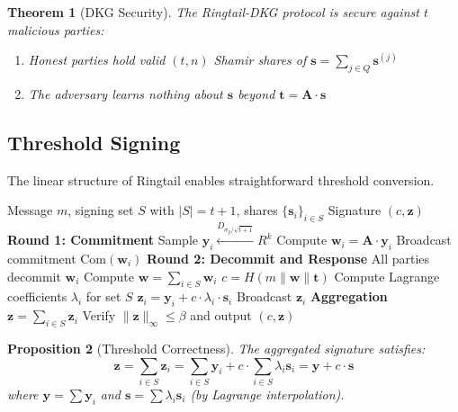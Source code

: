 \documentclass[11pt,a4paper]{article}
\newtheorem{theorem}{Theorem}[section]
\newtheorem{proposition}[theorem]{Proposition}
\begin{document}
\begin{theorem}[DKG Security]
The Ringtail-DKG protocol is secure against $t$ malicious parties:
\begin{enumerate}
    \item Honest parties hold valid $(t,n)$ Shamir shares of $\mathbf{s} = \sum_{j \in Q} \mathbf{s}^{(j)}$
    \item The adversary learns nothing about $\mathbf{s}$ beyond $\mathbf{t} = \mathbf{A} \cdot \mathbf{s}$
\end{enumerate}
\end{theorem}

\subsection{Threshold Signing}

The linear structure of Ringtail enables straightforward threshold conversion.

\begin{algorithm}
\caption{Ringtail-ThresholdSign}
\begin{algorithmic}[1]
\Require Message $m$, signing set $S$ with $|S| = t+1$, shares $\{\mathbf{s}_i\}_{i \in S}$
\Ensure Signature $(c, \mathbf{z})$
\State \textbf{Round 1: Commitment}
    \State Sample $\mathbf{y}_i \xleftarrow{D_{\sigma_y / \sqrt{t+1}}} R^k$ 
    \State Compute $\mathbf{w}_i = \mathbf{A} \cdot \mathbf{y}_i$
    \State Broadcast commitment $\text{Com}(\mathbf{w}_i)$
\EndFor
\State \textbf{Round 2: Decommit and Response}
\State All parties decommit $\mathbf{w}_i$
\State Compute $\mathbf{w} = \sum_{i \in S} \mathbf{w}_i$
\State $c = H(m \| \mathbf{w} \| \mathbf{t})$
\State Compute Lagrange coefficients $\lambda_i$ for set $S$
    \State $\mathbf{z}_i = \mathbf{y}_i + c \cdot \lambda_i \cdot \mathbf{s}_i$
    \State Broadcast $\mathbf{z}_i$
\EndFor
\State \textbf{Aggregation}
\State $\mathbf{z} = \sum_{i \in S} \mathbf{z}_i$
\State Verify $\|\mathbf{z}\|_\infty \leq \beta$ and output $(c, \mathbf{z})$
\end{algorithmic}
\end{algorithm}

\begin{proposition}[Threshold Correctness]
The aggregated signature satisfies:
\[
\mathbf{z} = \sum_{i \in S} \mathbf{z}_i = \sum_{i \in S} \mathbf{y}_i + c \cdot \sum_{i \in S} \lambda_i \mathbf{s}_i = \mathbf{y} + c \cdot \mathbf{s}
\]
where $\mathbf{y} = \sum \mathbf{y}_i$ and $\mathbf{s} = \sum \lambda_i \mathbf{s}_i$ (by Lagrange interpolation).
\end{proposition}
\end{document}
